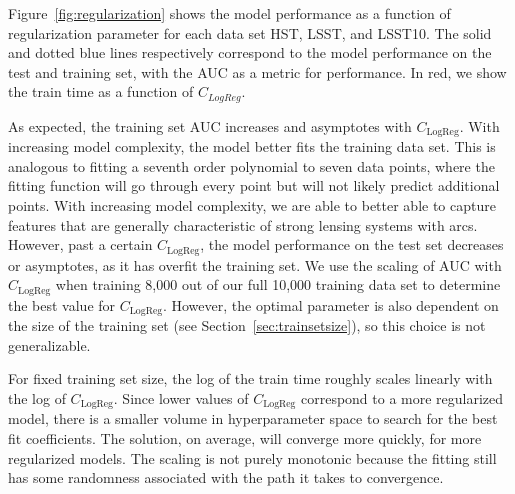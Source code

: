 \documentclass{emulateapj}
\begin{document}
Figure~\ref{fig:regularization} shows the model performance as a
function of regularization parameter for each data set HST, LSST, and
LSST10.  The solid and dotted blue lines respectively correspond to
the model performance on the test and training set, with the AUC as a
metric for performance.  In red, we show the train time as a function
of $C_{LogReg}$.

As expected, the training set AUC increases and asymptotes with
$C_\text{LogReg}$.  With increasing model complexity, the model better
fits the training data set.  This is analogous to fitting a seventh
order polynomial to seven data points, where the fitting function will
go through every point but will not likely predict additional points.
With increasing model complexity, we are able to better able to
capture features that are generally characteristic of strong lensing
systems with arcs. However, past a certain $C_\text{LogReg}$, the
model performance on the test set decreases or asymptotes, as it has
overfit the training set.  We use the scaling of AUC with
$C_\text{LogReg}$ when training 8,000 out of our full 10,000 training
data set to determine the best value for $C_\text{LogReg}$.  However,
the optimal parameter is also dependent on the size of the training
set (see Section~\ref{sec:trainsetsize}), so this choice is not
generalizable.

For fixed training set size, the log of the train time roughly scales
linearly with the log of $C_\text{LogReg}$.  Since lower values of
$C_\text{LogReg}$ correspond to a more regularized model, there is a
smaller volume in hyperparameter space to search for the best fit
coefficients.  The solution, on average, will converge more quickly,
for more regularized models.  The scaling is not purely monotonic
because the fitting still has some randomness associated with the path
it takes to convergence.
\end{document}
